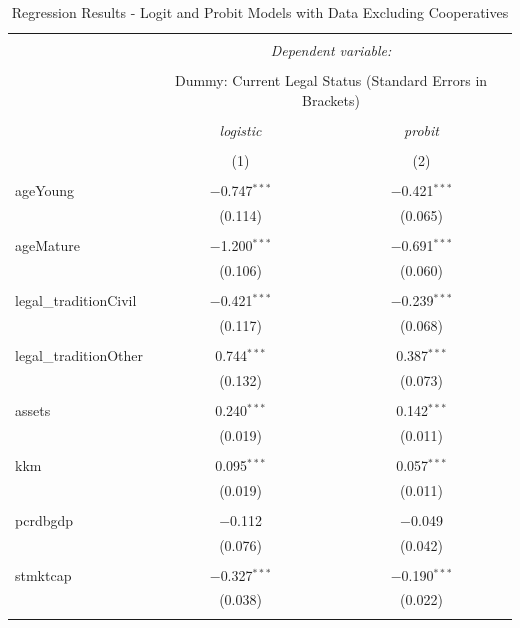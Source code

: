 \documentclass[a4paper,nobind]{templates/ociamthesis}
\begin{document}
\begin{table}[!htbp] \centering 
  \caption{Regression Results - Logit and Probit Models with Data Excluding Cooperatives} 
  \label{} 
\footnotesize 
\begin{tabular}{@{\extracolsep{5pt}}lcc} 
\\[-1.8ex]\hline 
\hline \\[-1.8ex] 
 & \multicolumn{2}{c}{\textit{Dependent variable:}} \\ 
\cline{2-3} 
\\[-1.8ex] & \multicolumn{2}{c}{Dummy: Current Legal Status (Standard Errors in Brackets)} \\ 
\\[-1.8ex] & \textit{logistic} & \textit{probit} \\ 
\\[-1.8ex] & (1) & (2)\\ 
\hline \\[-1.8ex] 
 ageYoung & $-$0.747$^{***}$ & $-$0.421$^{***}$ \\ 
  & (0.114) & (0.065) \\ 
  & & \\ 
 ageMature & $-$1.200$^{***}$ & $-$0.691$^{***}$ \\ 
  & (0.106) & (0.060) \\ 
  & & \\ 
 legal\_traditionCivil & $-$0.421$^{***}$ & $-$0.239$^{***}$ \\ 
  & (0.117) & (0.068) \\ 
  & & \\ 
 legal\_traditionOther & 0.744$^{***}$ & 0.387$^{***}$ \\ 
  & (0.132) & (0.073) \\ 
  & & \\ 
 assets & 0.240$^{***}$ & 0.142$^{***}$ \\ 
  & (0.019) & (0.011) \\ 
  & & \\ 
 kkm & 0.095$^{***}$ & 0.057$^{***}$ \\ 
  & (0.019) & (0.011) \\ 
  & & \\ 
 pcrdbgdp & $-$0.112 & $-$0.049 \\ 
  & (0.076) & (0.042) \\ 
  & & \\ 
 stmktcap & $-$0.327$^{***}$ & $-$0.190$^{***}$ \\ 
  & (0.038) & (0.022) \\ 
  & & \\ 

\end{tabular}
\end{table}
\end{document}

